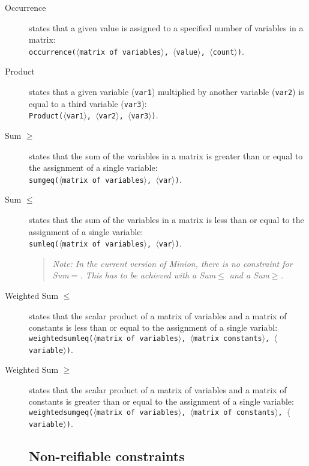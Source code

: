 \documentclass{article}
\begin{document}
\begin{small}
\begin{description}
\item[Occurrence] states that a given value is assigned to a specified
number of variables in a matrix:\\ \texttt{occurrence($\langle$matrix
of variables$\rangle$, $\langle$value$\rangle$,
$\langle$count$\rangle$)}.

\item[Product] states that a given variable (\texttt{var1}) multiplied
by another variable (\texttt{var2}) is equal to a third variable
(\texttt{var3}):\\ \texttt{Product($\langle$var1$\rangle$,
$\langle$var2$\rangle$, $\langle$var3$\rangle$)}.

\item[Sum $\mathbf{\geq}$] states that the sum of the variables in a
matrix is greater than or equal to the assignment of a single
variable:\\ \texttt{sumgeq($\langle$matrix of variables$\rangle$,
$\langle$var$\rangle$)}.

\item[Sum $\mathbf{\leq}$] states that the sum of the variables in a
matrix is less than or equal to the assignment of a single variable:\\
\texttt{sumleq($\langle$matrix of variables$\rangle$,
$\langle$var$\rangle$)}.

\begin{quote}
{\em Note: In the current version of {\sc Minion}, there is no 
constraint for Sum$=$.  This has to be achieved with a 
Sum$\mathbf{\leq}$ and a 
Sum$\mathbf{\geq}$.}
\end{quote}

\item[Weighted Sum $\mathbf{\leq}$] states that the scalar product of
a matrix of variables and a matrix of constants is less than or equal
to the assignment of a single variabl:\\
\texttt{weightedsumleq($\langle$matrix of variables$\rangle$,
$\langle$matrix constants$\rangle$, $\langle$variable$\rangle$)}.

\item[Weighted Sum $\mathbf{\geq}$] states that the scalar product of
a matrix of variables and a matrix of constants is greater than or
equal to the assignment of a single variable:\\
\texttt{weightedsumgeq($\langle$matrix of variables$\rangle$,
$\langle$matrix of constants$\rangle$, $\langle$variable$\rangle$)}.


\subsection*{Non-reifiable constraints}


\end{description}
\end{small}
\end{document}
